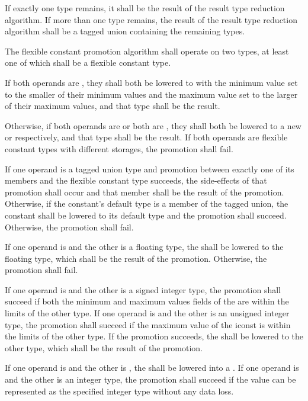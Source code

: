 \specsubitem
If exactly one type remains, it shall be the result of the result type reduction
algorithm. If more than one type remains, the result of the result type
reduction algorithm shall be a tagged union containing the remaining types.


\specsubitem
The flexible constant promotion algorithm shall operate on two types, at least
one of which shall be a flexible constant type.

\specsubitem
If both operands are , they shall both be lowered to
 with the minimum value set to the smaller of their
minimum values and the maximum value set to the larger of their maximum values,
and that type shall be the result.

\specsubitem
Otherwise, if both operands are  or both are ,
they shall both be lowered to a new  or 
respectively, and that type shall be the result. If both operands are flexible
constant types with different storages, the promotion shall fail.

\specsubitem
If one operand is a tagged union type and promotion between exactly one of its
members and the flexible constant type succeeds, the side-effects of that
promotion shall occur and that member shall be the result of the promotion.
Otherwise, if the constant's default type is a member of the tagged union, the
constant shall be lowered to its default type and the promotion shall succeed.
Otherwise, the promotion shall fail.

\specsubitem
If one operand is  and the other is a floating type, the
 shall be lowered to the floating type, which shall be the
result of the promotion. Otherwise, the promotion shall fail.


\specsubitem
If one operand is  and the other is a signed integer type, the
promotion shall succeed if both the minimum and maximum values fields of the
 are within the limits of the other type. If one operand is
 and the other is an unsigned integer type, the promotion shall
succeed if the maximum value of the iconst is within the limits of the other
type. If the promotion succeeds, the  shall be lowered to the
other type, which shall be the result of the promotion.

\specsubitem
If one operand is  and the other is , the
 shall be lowered into a . If one operand is
 and the other is an integer type, the promotion shall succeed
if the  value can be represented as the specified integer type
without any data loss.

